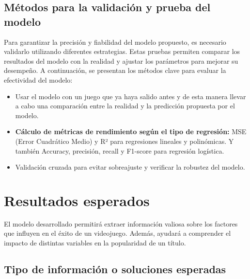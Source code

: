 \documentclass[titlepage,a4paper]{article}
\begin{document}
\subsection{Métodos para la validación y prueba del modelo}
Para garantizar la precisión y fiabilidad del modelo propuesto, es necesario validarlo utilizando diferentes estrategias. Estas pruebas permiten comparar los resultados del modelo con la realidad y ajustar los parámetros para mejorar su desempeño. A continuación, se presentan los métodos clave para evaluar la efectividad del modelo: \\

\begin{itemize}
    \item Usar el modelo con un juego que ya haya salido antes y de esta manera llevar a cabo una comparación entre la realidad y la predicción propuesta por el modelo. \\

    \item \textbf{Cálculo de métricas de rendimiento según el tipo de regresión:} MSE (Error Cuadrático Medio) y R² para regresiones lineales y polinómicas. Y también Accuracy, precisión, recall y F1-score para regresión logística. \\

    \item Validación cruzada para evitar sobreajuste y verificar la robustez del modelo.


\end{itemize}

\vspace{1cm}


\section{Resultados esperados}

El modelo desarrollado permitirá extraer información valiosa sobre los factores que influyen en el éxito de un videojuego. Además, ayudará a comprender el impacto de distintas variables en la popularidad de un título. \\

\subsection{Tipo de información o soluciones esperadas}
\end{document}

